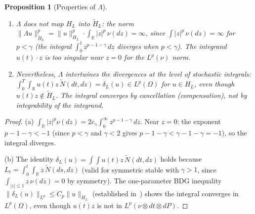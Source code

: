 \documentclass[11pt,a4paper]{article}
\theoremstyle{plain}
\newtheorem{proposition}[theorem]{Proposition}
\theoremstyle{definition}
\theoremstyle{remark}
\newcommand{\R}{\mathbb{R}}
\begin{document}
\begin{proposition}[Properties of $\Lambda$]
\label{prop:Lambda}
\begin{enumerate}[label=(\alph*)]
\item $\Lambda$ does \emph{not} map $H_L$ into
  $\widetilde{H}_L$: the norm
  $\|\Lambda u\|_{\widetilde{H}_L}^p
  = \|u\|_{H_L}^p \cdot \int_{\R}|z|^p\,\nu(dz) = \infty$,
  since $\int|z|^p\,\nu(dz) = \infty$ for $p < \gamma$
  (the integral $\int_0^1 z^{p-1-\gamma}\,dz$ diverges
  when $p < \gamma$).
  The integrand $u(t)\cdot z$ is too singular near $z = 0$
  for the $L^p(\nu)$ norm.
\item Nevertheless, $\Lambda$ intertwines the divergences
  \emph{at the level of stochastic integrals}:
  $\int_0^T\!\int_\R u(t)z\,\widetilde{N}(dt,dz) = \delta_L(u)
  \in L^p(\Omega)$ for $u \in H_L$, even though
  $u(t)z \notin \widetilde{H}_L$.
  The integral converges by cancellation (compensation),
  not by integrability of the integrand.
\end{enumerate}
\end{proposition}

\begin{proof}
(a) $\int_\R|z|^p\nu(dz) = 2c_\gamma\int_0^\infty
z^{p-1-\gamma}\,dz$.  Near $z = 0$: the exponent
$p - 1 - \gamma < -1$ (since $p < \gamma$ and $\gamma < 2$
gives $p - 1 - \gamma < \gamma - 1 - \gamma = -1$), so the
integral diverges.

(b) The identity $\delta_L(u) = \int\!\int u(t)z\,
\widetilde{N}(dt,dz)$ holds because $L_t = \int_0^t\!\int_\R
z\,\widetilde{N}(ds,dz)$ (valid for symmetric stable with
$\gamma > 1$, since $\int_{|z|\leq 1}z\,\nu(dz) = 0$
by symmetry).  The one-parameter BDG inequality
$\|\delta_L(u)\|_{L^p} \leq C_p\|u\|_{H_L}$ (established
in~\cite{Fontes2026d}) shows the integral converges in
$L^p(\Omega)$, even though $u(t)z$ is not in
$L^p(\nu\otimes dt\otimes dP)$.
\end{proof}
\end{document}
